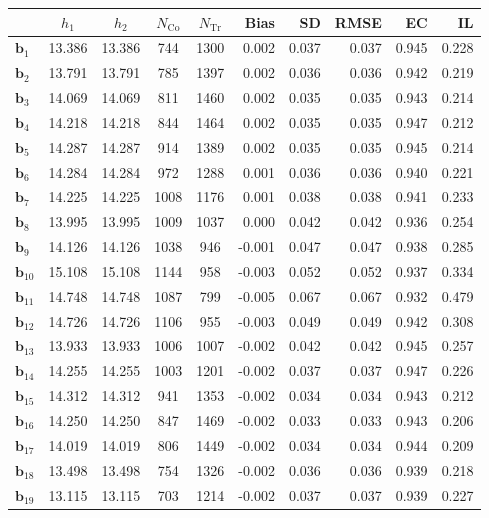 \documentclass[10pt]{article}
\newcommand{\bb}{\mathbf{b}}
\begin{document}
\begin{table}[p]
    \centering
\begin{tabular}{lccccrrrrr}
\toprule\toprule
 & $h_1$ & $h_2$ & $N_{\mathrm{Co}}$ & $N_{\mathrm{Tr}}$ & Bias & SD & RMSE & EC & IL \\
\midrule
$\bb_{1}$ & 13.386 & 13.386 & 744 & 1300 & 0.002 & 0.037 & 0.037 & 0.945 & 0.228 \\
$\bb_{2}$ & 13.791 & 13.791 & 785 & 1397 & 0.002 & 0.036 & 0.036 & 0.942 & 0.219 \\
$\bb_{3}$ & 14.069 & 14.069 & 811 & 1460 & 0.002 & 0.035 & 0.035 & 0.943 & 0.214 \\
$\bb_{4}$ & 14.218 & 14.218 & 844 & 1464 & 0.002 & 0.035 & 0.035 & 0.947 & 0.212 \\
$\bb_{5}$ & 14.287 & 14.287 & 914 & 1389 & 0.002 & 0.035 & 0.035 & 0.945 & 0.214 \\
$\bb_{6}$ & 14.284 & 14.284 & 972 & 1288 & 0.001 & 0.036 & 0.036 & 0.940 & 0.221 \\
$\bb_{7}$ & 14.225 & 14.225 & 1008 & 1176 & 0.001 & 0.038 & 0.038 & 0.941 & 0.233 \\
$\bb_{8}$ & 13.995 & 13.995 & 1009 & 1037 & 0.000 & 0.042 & 0.042 & 0.936 & 0.254 \\
$\bb_{9}$ & 14.126 & 14.126 & 1038 & 946 & -0.001 & 0.047 & 0.047 & 0.938 & 0.285 \\
$\bb_{10}$ & 15.108 & 15.108 & 1144 & 958 & -0.003 & 0.052 & 0.052 & 0.937 & 0.334 \\
$\bb_{11}$ & 14.748 & 14.748 & 1087 & 799 & -0.005 & 0.067 & 0.067 & 0.932 & 0.479 \\
$\bb_{12}$ & 14.726 & 14.726 & 1106 & 955 & -0.003 & 0.049 & 0.049 & 0.942 & 0.308 \\
$\bb_{13}$ & 13.933 & 13.933 & 1006 & 1007 & -0.002 & 0.042 & 0.042 & 0.945 & 0.257 \\
$\bb_{14}$ & 14.255 & 14.255 & 1003 & 1201 & -0.002 & 0.037 & 0.037 & 0.947 & 0.226 \\
$\bb_{15}$ & 14.312 & 14.312 & 941 & 1353 & -0.002 & 0.034 & 0.034 & 0.943 & 0.212 \\
$\bb_{16}$ & 14.250 & 14.250 & 847 & 1469 & -0.002 & 0.033 & 0.033 & 0.943 & 0.206 \\
$\bb_{17}$ & 14.019 & 14.019 & 806 & 1449 & -0.002 & 0.034 & 0.034 & 0.944 & 0.209 \\
$\bb_{18}$ & 13.498 & 13.498 & 754 & 1326 & -0.002 & 0.036 & 0.036 & 0.939 & 0.218 \\
$\bb_{19}$ & 13.115 & 13.115 & 703 & 1214 & -0.002 & 0.037 & 0.037 & 0.939 & 0.227 \\

\end{tabular}
\end{table}
\end{document}
